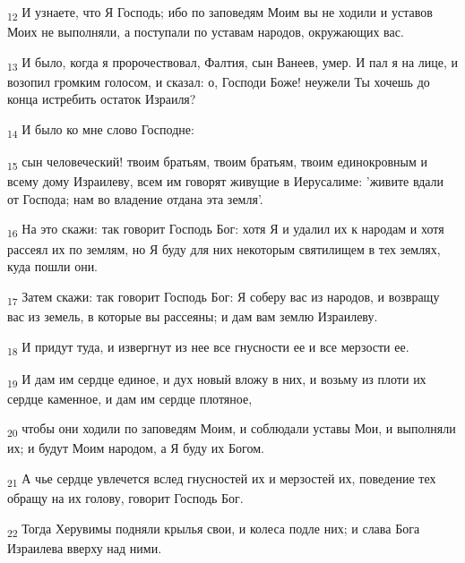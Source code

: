 \begin{tcolorbox}
\textsubscript{12} И узнаете, что Я Господь; ибо по заповедям Моим вы не ходили и уставов Моих не выполняли, а поступали по уставам народов, окружающих вас.
\end{tcolorbox}
\begin{tcolorbox}
\textsubscript{13} И было, когда я пророчествовал, Фалтия, сын Ванеев, умер. И пал я на лице, и возопил громким голосом, и сказал: о, Господи Боже! неужели Ты хочешь до конца истребить остаток Израиля?
\end{tcolorbox}
\begin{tcolorbox}
\textsubscript{14} И было ко мне слово Господне:
\end{tcolorbox}
\begin{tcolorbox}
\textsubscript{15} сын человеческий! твоим братьям, твоим братьям, твоим единокровным и всему дому Израилеву, всем им говорят живущие в Иерусалиме: 'живите вдали от Господа; нам во владение отдана эта земля'.
\end{tcolorbox}
\begin{tcolorbox}
\textsubscript{16} На это скажи: так говорит Господь Бог: хотя Я и удалил их к народам и хотя рассеял их по землям, но Я буду для них некоторым святилищем в тех землях, куда пошли они.
\end{tcolorbox}
\begin{tcolorbox}
\textsubscript{17} Затем скажи: так говорит Господь Бог: Я соберу вас из народов, и возвращу вас из земель, в которые вы рассеяны; и дам вам землю Израилеву.
\end{tcolorbox}
\begin{tcolorbox}
\textsubscript{18} И придут туда, и извергнут из нее все гнусности ее и все мерзости ее.
\end{tcolorbox}
\begin{tcolorbox}
\textsubscript{19} И дам им сердце единое, и дух новый вложу в них, и возьму из плоти их сердце каменное, и дам им сердце плотяное,
\end{tcolorbox}
\begin{tcolorbox}
\textsubscript{20} чтобы они ходили по заповедям Моим, и соблюдали уставы Мои, и выполняли их; и будут Моим народом, а Я буду их Богом.
\end{tcolorbox}
\begin{tcolorbox}
\textsubscript{21} А чье сердце увлечется вслед гнусностей их и мерзостей их, поведение тех обращу на их голову, говорит Господь Бог.
\end{tcolorbox}
\begin{tcolorbox}
\textsubscript{22} Тогда Херувимы подняли крылья свои, и колеса подле них; и слава Бога Израилева вверху над ними.
\end{tcolorbox}
